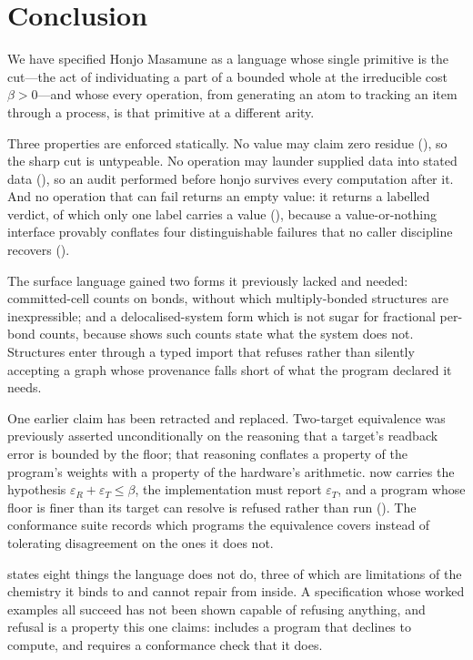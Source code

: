 \documentclass[11pt,twocolumn,a4paper]{article}
\theoremstyle{thmstyle}
\theoremstyle{definition}
\theoremstyle{remark}
\newcommand{\flo}{\beta}
\newcommand{\eps}{\varepsilon}
\begin{document}
\section{Conclusion}
\label{sec:conclusion}

We have specified Honjo Masamune as a language whose single primitive is
the cut---the act of individuating a part of a bounded whole at the
irreducible cost $\flo>0$---and whose every operation, from generating an
atom to tracking an item through a process, is that primitive at a
different arity.

Three properties are enforced statically. No value may claim zero residue
(), so the sharp cut is untypeable. No operation
may launder supplied data into stated data
(), so an audit performed before
honjo survives every computation after it. And no operation that can fail
returns an empty value: it returns a labelled verdict, of which only one
label carries a value (), because a value-or-nothing
interface provably conflates four distinguishable failures that no
caller discipline recovers ().

The surface language gained two forms it previously lacked and needed:
committed-cell counts on bonds, without which multiply-bonded structures
are inexpressible; and a delocalised-system form which is not sugar for
fractional per-bond counts, because  shows such counts
state what the system does not. Structures enter through a typed import
that refuses rather than silently accepting a graph whose provenance
falls short of what the program declared it needs.

One earlier claim has been retracted and replaced. Two-target equivalence
was previously asserted unconditionally on the reasoning that a target's
readback error is bounded by the floor; that reasoning conflates a
property of the program's weights with a property of the hardware's
arithmetic.  now carries the hypothesis
$\eps_R+\eps_T\le\flo$, the implementation must report $\eps_T$, and a
program whose floor is finer than its target can resolve is refused
rather than run (). The conformance suite
records which programs the equivalence covers instead of tolerating
disagreement on the ones it does not.

 states eight things the language does not do, three of
which are limitations of the chemistry it binds to and cannot repair from
inside. A specification whose worked examples all succeed has not been
shown capable of refusing anything, and refusal is a property this one
claims:  includes a program that declines to compute,
and  requires a conformance check that it does.



\end{document}
